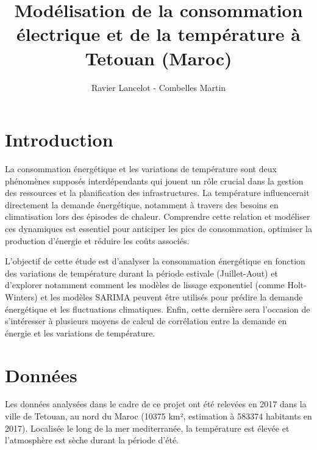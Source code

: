 \documentclass{article}
\theoremstyle{definition}
\theoremstyle{remark}
\begin{document}
\title{\vspace{-2cm}\LARGE Modélisation de la consommation électrique et de la température à Tetouan (Maroc)}
\author{Ravier Lancelot - Combelles Martin}
\maketitle
\section{Introduction}
La consommation énergétique et les variations de température sont deux phénomènes supposés interdépendants qui jouent un rôle crucial dans la gestion des ressources et la planification des infrastructures. La température influencerait directement la demande énergétique, notamment à travers des besoins en climatisation lors des épisodes de chaleur. Comprendre cette relation et modéliser ces dynamiques est essentiel pour anticiper les pics de consommation, optimiser la production d'énergie et réduire les coûts associés.\newline 

L'objectif de cette étude est d'analyser la consommation énergétique en fonction des variations de température durant la période estivale (Juillet-Aout) et d'explorer notamment comment les modèles de lissage exponentiel (comme Holt-Winters) et les modèles SARIMA peuvent être utilisés pour prédire la demande énergétique et les fluctuations climatiques. Enfin, cette dernière sera l'occasion de s'intéresser à plusieurs moyens de calcul de corrélation entre la demande en énergie et les variations de température.
\section{Données}
Les données analysées dans le cadre de ce projet ont été relevées en 2017 dans la ville de Tetouan, au nord du Maroc (10375 km², estimation à 583374 habitants en 2017). Localisée le long de la mer mediterranée, la température est élevée et l'atmosphère est sèche  durant la période d'été.\newline
\end{document}
